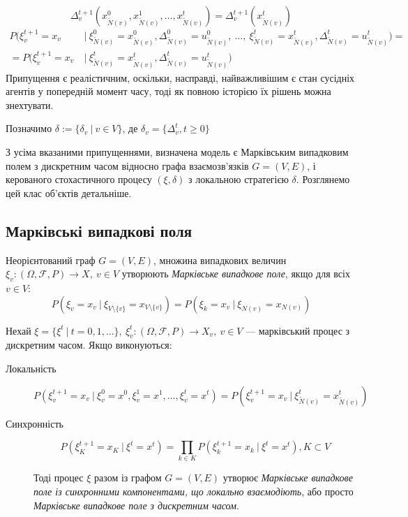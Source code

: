 \documentclass[oneside,draft,14pt]{extarticle}
\begin{document}
\begin{description}
	\[\Delta_v^{t+1}(x_{\tilde{N}(v)}^0, x_{\tilde{N}(v)}^1, \ldots, x_{\tilde{N}(v)}^t) = \Delta_v^{t+1}(x_{\tilde{N}(v)}^t)\]
	\begin{align*}
	P(\xi_v^{t+1} = x_v\ &|\ \xi_{\tilde N(v)}^0 = x_{\tilde N(v)}^0, \Delta_{\tilde N(v)}^0 = u_{\tilde N(v)}^0,\ \ldots,\ \xi_{\tilde N(v)}^t = x_{\tilde N(v)}^t, \Delta_{\tilde N(v)}^t = u_{\tilde N(v)}^t) = \\
	= P(\xi_v^{t+1} = x_v\ &|\ \xi_{\tilde N(v)}^t = x_{\tilde N(v)}^t, \Delta_{\tilde N(v)}^t = u_{\tilde N(v)}^t)
	\end{align*}
	Припущення є реалістичним, оскільки, насправді, найважливішим є стан сусідніх агентів у попередній момент часу, тоді як повною історією їх рішень можна знехтувати.
\end{description}

Позначимо \(\delta := \{\delta_v\ |\ v \in V\}\), де \(\delta_v = \{\Delta_v^t, t \geq 0\}\)

З усіма вказаними припущеннями, визначена модель є Марківським випадковим полем з дискретним часом відносно графа взаємозв’язків \(G = (V, E)\), і керованого стохастичного процесу \((\xi, \delta)\) з локальною стратегією \(\delta\). Розглянемо цей клас об’єктів детальніше.

\subsection{Марківські випадкові поля}
\begin{definition}
Неорієнтований граф \(G = (V, E)\), множина випадкових величин \(\xi_v : (\Omega, \mathcal{F}, P) \rightarrow X,\ v \in V\) утворюють \textit{Марківське випадкове поле}, якщо для всіх \(v \in V\):
\[P(\xi_v = x_v\ |\ \xi_{V\setminus\{v\}} = x_{V\setminus\{v\}}) = P(\xi_k = x_v\ |\ \xi_{N(v)} = x_{N(v)})\]
\end{definition}

\begin{definition}
Нехай \(\xi = \{\xi^t\ |\ t=0,1,\ldots\},\ \xi^t_v : (\Omega, \mathcal{F}, P) \rightarrow X_v,\ v \in V \) — марківський процес з дискретним часом. 
Якщо виконуються:
\begin{description}
    \item[Локальність] \[P(\xi_v^{t+1} = x_v\ |\ \xi_v^0 = x^0, \xi_v^1 = x^1, \ldots, \xi_v^t = x^t) = P(\xi_v^{t+1} = x_v\ |\ \xi_{\tilde N(v)}^t = x_{\tilde N(v)}^t )\]
    \item[Синхронність] \[P(\xi^{t+1}_K = x_K\ |\ \xi^t = x^t) = \prod_{k \in K} P(\xi^{t+1}_k = x_k\ |\ \xi^t = x^t), K \subset V\]

Тоді процес \(\xi\) разом із графом \(G = (V, E)\) утворює \textit{Марківське випадкове поле із синхронними компонентами, що локально взаємодіють}, або просто \textit{Марківське випадкове поле з дискретним часом}.
\end{description}
\end{definition}


\clearpage

\nocite{David:1998}
\nocite{Knopov:2011}
\nocite{Knopov:1998}
\nocite{Chornei:2005}
\nocite{Koller:2009}



\end{document}
